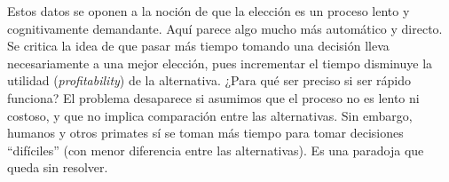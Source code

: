 \documentclass[a4paper,12pt]{article}
\begin{document}
Estos datos se oponen a la noción de que la elección es un proceso lento y cognitivamente demandante. Aquí parece algo mucho más automático y directo. Se critica la idea de que pasar más tiempo tomando una decisión lleva necesariamente a una mejor elección, pues incrementar el tiempo disminuye la utilidad ({\slshape profitability}) de la alternativa. ¿Para qué ser preciso si ser rápido funciona? El problema desaparece si asumimos que el proceso no es lento ni costoso, y que no implica comparación entre las alternativas. Sin embargo, humanos y otros primates sí se toman más tiempo para tomar decisiones ``difíciles'' (con menor diferencia entre las alternativas). Es una paradoja que queda sin resolver.
\end{document}
